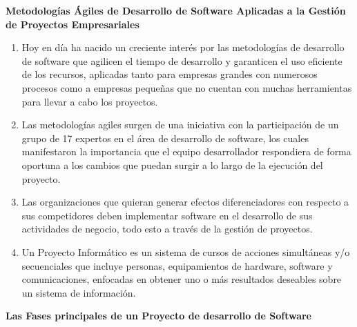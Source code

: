 \documentclass{article} %
\begin{document}


\noindent \textbf{Metodolog\'{i}as \'{A}giles de Desarrollo de Software Aplicadas a la Gesti\'{o}n de Proyectos Empresariales}

\begin{enumerate}
\item \textbf{ }Hoy en d\'{i}a ha nacido un creciente inter\'{e}s por las metodolog\'{i}as de desarrollo de software que agilicen el tiempo de desarrollo y garanticen el uso eficiente de los recursos, aplicadas tanto para empresas grandes con numerosos procesos como a empresas peque\~{n}as que no cuentan con muchas herramientas para llevar a cabo los proyectos.

\item  Las metodolog\'{i}as agiles surgen de una iniciativa con la participaci\'{o}n de un grupo de 17 expertos en el \'{a}rea de desarrollo de software, los cuales manifestaron la importancia que el equipo desarrollador respondiera de forma oportuna a los cambios que puedan surgir a lo largo de la ejecuci\'{o}n del proyecto.

\item  Las organizaciones que quieran generar efectos diferenciadores con respecto a sus competidores deben implementar software en el desarrollo de sus actividades de negocio, todo esto a trav\'{e}s de la gesti\'{o}n de proyectos.

\item  Un Proyecto Inform\'{a}tico es un sistema de cursos de acciones simult\'{a}neas y/o secuenciales que incluye personas, equipamientos de hardware, software y comunicaciones, enfocadas en obtener uno o m\'{a}s resultados deseables sobre un sistema de informaci\'{o}n.
\end{enumerate}

\noindent \textbf{Las Fases principales de un Proyecto de desarrollo de Software}
\end{document}
